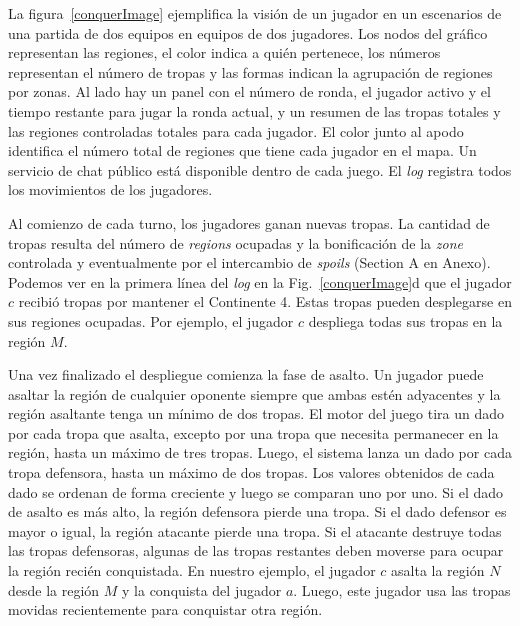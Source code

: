 \documentclass[a4paper,11pt]{book}
\theoremstyle{definition}
\begin{document}

La figura~\ref{conquerImage} ejemplifica la visi\'on de un jugador en un escenarios de una partida de dos equipos en equipos de dos jugadores.
%
Los nodos del gr\'afico representan las regiones, el color indica a qui\'en pertenece, los n\'umeros representan el n\'umero de tropas y las formas indican la agrupaci\'on de regiones por zonas.
%
Al lado hay un panel con el n\'umero de ronda, el jugador activo y el tiempo restante para jugar la ronda actual, y un resumen de las tropas totales y las regiones controladas totales para cada jugador.
%
El color junto al apodo identifica el n\'umero total de regiones que tiene cada jugador en el mapa.
%
Un servicio de chat p\'ublico est\'a disponible dentro de cada juego.
%
El \emph{log} registra todos los movimientos de los jugadores.


Al comienzo de cada turno, los jugadores ganan nuevas tropas.
%
La cantidad de tropas resulta del n\'umero de \emph{regions} ocupadas y la bonificaci\'on de la \emph{zone} controlada y eventualmente por el intercambio de \emph{spoils} (Section A en Anexo).
%
Podemos ver en la primera l\'inea del \emph{log} en la Fig.~\ref{conquerImage}d que el jugador $c$ recibi\'o tropas por mantener el Continente 4.
%
Estas tropas pueden desplegarse en sus regiones ocupadas.
%
Por ejemplo, el jugador $c$ despliega todas sus tropas en la regi\'on $M$.


Una vez finalizado el despliegue comienza la fase de asalto.
%
Un jugador puede asaltar la regi\'on de cualquier oponente siempre que ambas est\'en adyacentes y la regi\'on asaltante tenga un m\'inimo de dos tropas.
%
El motor del juego tira un dado por cada tropa que asalta, excepto por una tropa que necesita permanecer en la regi\'on, hasta un m\'aximo de tres tropas.
%
Luego, el sistema lanza un dado por cada tropa defensora, hasta un m\'aximo de dos tropas.
%
Los valores obtenidos de cada dado se ordenan de forma creciente y luego se comparan uno por uno.
%
Si el dado de asalto es m\'as alto, la regi\'on defensora pierde una tropa.
%
Si el dado defensor es mayor o igual, la regi\'on atacante pierde una tropa.
%
Si el atacante destruye todas las tropas defensoras, algunas de las tropas restantes deben moverse para ocupar la regi\'on reci\'en conquistada.
%
En nuestro ejemplo, el jugador $c$ asalta la regi\'on $N$ desde la regi\'on $M$ y la conquista del jugador $a$.
%
Luego, este jugador usa las tropas movidas recientemente para conquistar otra regi\'on.
\end{document}
